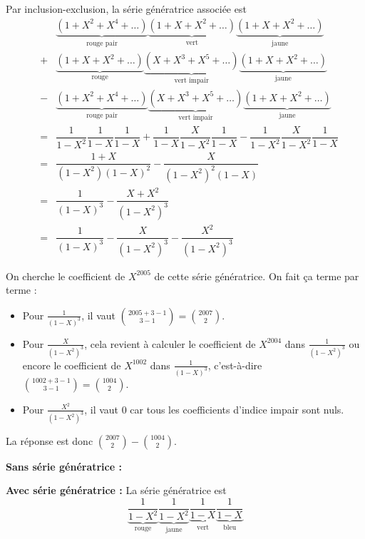 \begin{sol}
Par inclusion-exclusion, la série génératrice associée est
$$\begin{array}{rcl}
&  & \underbrace{(1 + X^2 + X^4 + \dots)}_{\text{rouge pair}}\underbrace{(1 + X + X^2 + \dots)}_{\text{vert}}\underbrace{(1 + X + X^2 + \dots)}_{\text{jaune}} \\
& + & \underbrace{(1 + X + X^2 + \dots)}_{\text{rouge}}\underbrace{(X + X^3 + X^5 + \dots)}_{\text{vert impair}}\underbrace{(1 + X + X^2 + \dots)}_{\text{jaune}} \\
& - & \underbrace{(1 + X^2 + X^4 + \dots)}_{\text{rouge pair}}\underbrace{(X + X^3 + X^5 + \dots)}_{\text{vert impair}}\underbrace{(1 + X + X^2 + \dots)}_{\text{jaune}} \\
& = & \dfrac{1}{1 - X^2}\dfrac{1}{1 - X}\dfrac{1}{1 - X} + \dfrac{1}{1 - X}\dfrac{X}{1 - X^2}\dfrac{1}{1 - X} - \dfrac{1}{1 - X^2}\dfrac{X}{1 - X^2}\dfrac{1}{1 - X} \\
& = & \dfrac{1 + X}{(1 - X^2)(1 - X)^2} - \dfrac{X}{(1 - X^2)^2(1 - X)} \\
& = & \dfrac{1}{(1 - X)^3} - \dfrac{X + X^2}{(1 - X^2)^3} \\
& = & \dfrac{1}{(1 - X)^3} - \dfrac{X}{(1 - X^2)^3} - \dfrac{X^2}{(1 - X^2)^3}
\end{array}$$

On cherche le coefficient de $X^{2005}$ de cette série génératrice. On fait ça terme par terme :
\begin{itemize}
\item Pour $\frac{1}{(1-X)^3}$, il vaut $\binom{2005 + 3 - 1}{3 - 1} = \binom{2007}{2}$.
\item Pour $\frac{X}{(1-X^2)^3}$, cela revient à calculer le coefficient de $X^{2004}$ dans $\frac{1}{(1 - X^2)^3}$ ou encore le coefficient de $X^{1002}$ dans $\frac{1}{(1-X)^3}$, c'est-à-dire $\binom{1002 + 3 - 1}{3 - 1} = \binom{1004}{2}$.
\item Pour $\frac{X^2}{(1-X^2)^3}$, il vaut $0$ car tous les coefficients d'indice impair sont nuls.
\end{itemize}
La réponse est donc $\binom{2007}{2} - \binom{1004}{2}$.
\end{sol}


\begin{sol}
\textbf{Sans série génératrice :}

\textbf{Avec série génératrice :} La série génératrice est
$$\underbrace{\frac 1{1 - X^2}}_{\text{rouge}}\underbrace{\frac 1{1 - X^2}}_{\text{jaune}}\underbrace{\frac 1{1 - X}}_{\text{vert}}\underbrace{\frac 1{1 - X}}_{\text{bleu}}$$
\end{sol}


